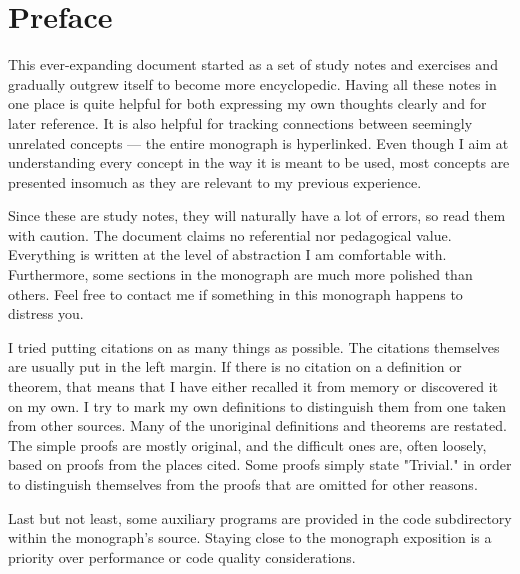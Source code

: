 \chapter*{Preface}

This ever-expanding document started as a set of study notes and exercises and gradually outgrew itself to become more encyclopedic. Having all these notes in one place is quite helpful for both expressing my own thoughts clearly and for later reference. It is also helpful for tracking connections between seemingly unrelated concepts --- the entire monograph is hyperlinked. Even though I aim at understanding every concept in the way it is meant to be used, most concepts are presented insomuch as they are relevant to my previous experience.

Since these are study notes, they will naturally have a lot of errors, so read them with caution. The document claims no referential nor pedagogical value. Everything is written at the level of abstraction I am comfortable with. Furthermore, some sections in the monograph are much more polished than others. Feel free to contact me if something in this monograph happens to distress you.

I tried putting citations on as many things as possible. The citations themselves are usually put in the left margin. If there is no citation on a definition or theorem, that means that I have either recalled it from memory or discovered it on my own. I try to mark my own definitions to distinguish them from one taken from other sources. Many of the unoriginal definitions and theorems are restated. The simple proofs are mostly original, and the difficult ones are, often loosely, based on proofs from the places cited. Some proofs simply state "Trivial." in order to distinguish themselves from the proofs that are omitted for other reasons.

Last but not least, some auxiliary programs are provided in the code subdirectory within the monograph's source. Staying close to the monograph exposition is a priority over performance or code quality considerations.
